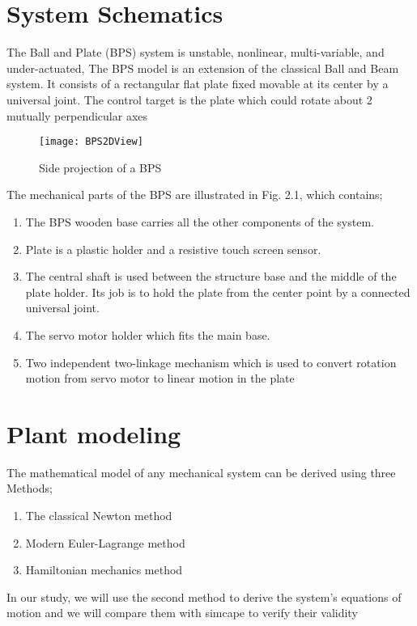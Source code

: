 \graphicspath{ {Figures/chapter03} }
\section{System Schematics}
The Ball and Plate (BPS) system is unstable, nonlinear, multi-variable, and under-actuated, The BPS model is an extension of the classical Ball and Beam system. It consists of a rectangular flat plate fixed movable at its center by a universal joint. The control target is the plate which could rotate about 2 mutually perpendicular axes
\begin{figure}[h]
\centering
\texttt{[image: BPS2DView]}
\caption{Side projection of a BPS}
\end{figure}
The mechanical parts of the BPS are illustrated in Fig. 2.1, which contains;
\begin{enumerate}
\item The BPS wooden base carries all the other components of the system.
\item Plate is a plastic holder and a resistive touch screen sensor.
\item The central shaft is used between the structure base and the middle of the plate holder. Its job is to hold the plate from the center point by a connected universal joint.
\item The servo motor holder which fits the main base.
\item Two independent two-linkage mechanism which is used to convert rotation motion from servo motor to linear motion in the plate
\end{enumerate}


\section{Plant modeling}
The mathematical model of any mechanical system can be derived using three
Methods;
\begin{enumerate}
 \item The classical Newton method 
 \item Modern Euler-Lagrange method
 \item Hamiltonian mechanics method
 \end{enumerate}
In our study, we will use the second method to derive the system's equations of motion and we will compare them with simcape to verify their validity
